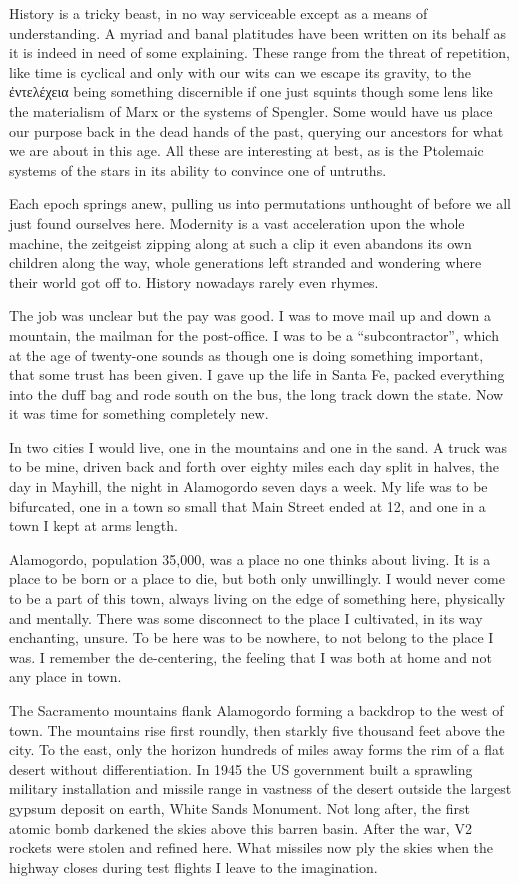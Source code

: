 \documentclass[ebook, 10pt, openright, onecolumn]{memoir}
\newcommand{\textgreek}[1]{\begingroup\fontencoding{LGR}\selectfont#1\endgroup}
\newlength{\drop}
\newcommand*\td[1]{
  \todo[inline]{
     #1 
  }
}
\newcommand*\finish{\td{ ----- Finish this section -----}}
\begin{document}
History is a tricky beast, in no way serviceable except as a means of
understanding.  A myriad and banal platitudes have been written on its behalf as
it is indeed in need of some explaining.  These range from the threat of
repetition, like time is cyclical and only with our wits can we escape its
gravity, to the \textgreek{ἐντελέχεια} being something discernible if one just squints
though some lens like the materialism of Marx or the systems of Spengler. Some
would have us place our purpose back in the dead hands of the past, querying our
ancestors for what we are about in this age.  All these are interesting at best,
as is the Ptolemaic systems of the stars in its ability to convince one of
untruths.

Each epoch springs anew, pulling us into permutations unthought of before we all
just found ourselves here.  Modernity is a vast acceleration upon the whole
machine, the zeitgeist zipping along at such a clip it even abandons its own
children along the way, whole generations left stranded and wondering where
their world got off to.  History nowadays rarely even rhymes.
\finish{}

The job was unclear but the pay was good.  I was to move mail up and down a
mountain, the mailman for the post-office.  I was to be a ``subcontractor'', which
at the age of twenty-one sounds as though one is doing something important, that
some trust has been given.  I gave up the life in Santa Fe,  packed everything
into the duff bag and rode south on the bus, the long track down the state.  Now
it was time for something completely new.

In two cities I would live, one in the mountains and one in the sand.  A truck
was to be mine, driven back and forth over eighty miles each day split in
halves, the day in Mayhill, the night in Alamogordo seven days a week.  My life
was to be bifurcated, one in a town so small that Main Street ended at 12, and
one in a town I kept at arms length.

Alamogordo, population 35,000, was a place no one thinks about living.  It is a
place to be born or a place to die, but both only unwillingly.  I would never
come to be a part of this town, always living on the edge of something here,
physically and mentally.  There was some disconnect to the place I cultivated,
in its way enchanting, unsure.  To be here was to be nowhere, to not belong to
the place I was.  I remember the de-centering, the feeling that I was both at
home and not any place in town.

The Sacramento mountains flank Alamogordo forming a backdrop to the west of
town.  The mountains rise first roundly, then starkly five thousand feet above
the city.  To the east, only the horizon hundreds of miles away forms the rim of
a flat desert without differentiation.  In 1945 the US government built a
sprawling military installation and missile range in vastness of the desert
outside the largest gypsum deposit on earth, White Sands Monument.  Not long
after, the first atomic bomb darkened the skies above this barren basin.  After
the war, V2 rockets were stolen and refined here.  What missiles now ply the
skies when the highway closes during test flights I leave to the imagination.
\end{document}
